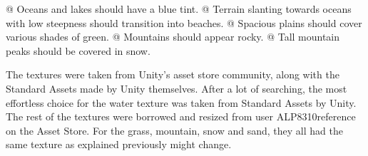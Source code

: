 \begin{easylist}
 @ Oceans and lakes should have a blue tint.
 @ Terrain slanting towards oceans with low steepness should transition into beaches.
 @ Spacious plains should cover various shades of green.
 @ Mountains should appear rocky.
 @ Tall mountain peaks should be covered in snow.
\end{easylist}


The textures were taken from Unity’s asset store community, along with the Standard Assets made by Unity themselves.
After a lot of searching, the most effortless choice for the water texture was taken from Standard Assets by Unity.
The rest of the textures were borrowed and resized from user ALP8310{reference} on the Asset Store.
For the grass, mountain, snow and sand, they all had the same texture as explained previously {might change}.
